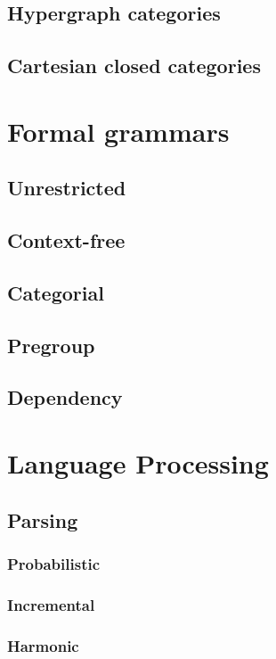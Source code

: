     \section{Hypergraph categories}
    \section{Cartesian closed categories}

\chapter{Formal grammars}

    \section{Unrestricted}
    \section{Context-free}
    \section{Categorial}
    \section{Pregroup}
    \section{Dependency}

\chapter{Language Processing}

    \section{Parsing}
        \subsection{Probabilistic}
        \subsection{Incremental}
        \subsection{Harmonic}

